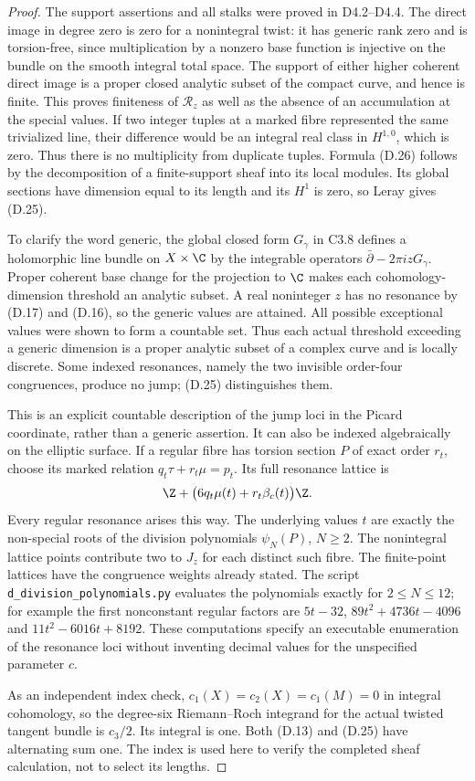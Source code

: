 \begin{proof}
The support assertions and all stalks were proved in D4.2--D4.4.
The direct image in degree zero is zero for a nonintegral twist:
it has generic rank zero and is torsion-free, since multiplication
by a nonzero base function is injective on the bundle on the smooth
integral total space. The support of either higher coherent direct
image is a proper closed analytic subset of the compact curve,
and hence is finite. This proves finiteness of $\mathcal R_z$ as
well as the absence of an accumulation at the special values.
If two integer tuples at a marked fibre represented the same
trivialized line, their difference would be an integral real class
in $H^{1,0}$, which is zero. Thus there is no multiplicity from
duplicate tuples. Formula (D.26) follows by the decomposition of a
finite-support sheaf into its local modules. Its global sections
have dimension equal to its length and its $H^1$ is zero, so Leray
gives (D.25).

To clarify the word generic, the global closed form $G_\gamma$ in
C3.8 defines a holomorphic line bundle on $X\times\C$ by the
integrable operators $\bar\partial-2\pi i zG_\gamma$. Proper
coherent base change for the projection to $\C$ makes each
cohomology-dimension threshold an analytic subset. A real noninteger
$z$ has no resonance by (D.17) and (D.16), so the generic values are
attained. All possible exceptional values were shown to form a
countable set. Thus each actual threshold exceeding a generic
dimension is a proper analytic subset of a complex curve and is
locally discrete. Some indexed resonances, namely the two invisible
order-four congruences, produce no jump; (D.25) distinguishes them.

This is an explicit countable description of the jump loci in the
Picard coordinate, rather than a generic assertion. It can also be
indexed algebraically on the elliptic surface. If a regular fibre
has torsion section $P$ of exact order $r_t$, choose its marked
relation $q_t\tau+r_t\mu=p_t$. Its full resonance lattice is
\[
 \Z+\bigl(6q_t\mu(t)+r_t\beta_c(t)\bigr)\Z.
\]
Every regular resonance arises this way. The underlying values
$t$ are exactly the non-special roots of the division polynomials
$\psi_N(P)$, $N\ge2$. The nonintegral lattice points contribute two
to $J_z$ for each distinct such fibre. The finite-point lattices
have the congruence weights already stated. The script
\texttt{d\_division\_polynomials.py} evaluates the polynomials
exactly for $2\le N\le12$; for example the first nonconstant
regular factors are $5t-32$, $89t^2+4736t-4096$ and
$11t^2-6016t+8192$. These computations specify an executable
enumeration of the resonance loci without inventing decimal values
for the unspecified parameter $c$.

As an independent index check, $c_1(X)=c_2(X)=c_1(M)=0$ in integral
cohomology, so the degree-six Riemann--Roch integrand for the actual
twisted tangent bundle is $c_3/2$. Its integral is one. Both (D.13)
and (D.25) have alternating sum one. The index is used here to
verify the completed sheaf calculation, not to select its lengths.
\end{proof}

